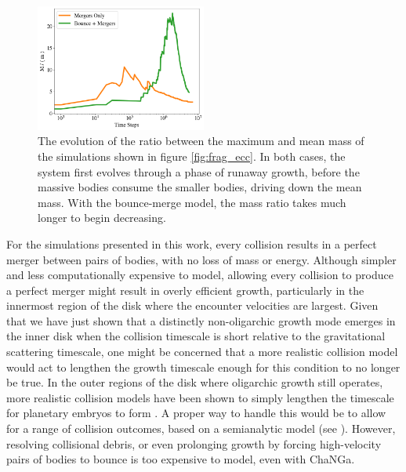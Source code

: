 \documentclass[twocolumn,linenumbers]{aastex63}
\begin{document}
\begin{figure}
\begin{center}
    \includegraphics[width=0.5\textwidth]{figures/frag_evo.png}
    \caption{The evolution of the ratio between the maximum and mean mass of the simulations shown in figure \ref{fig:frag_ecc}. 
    In both cases, the system first evolves through a phase of runaway growth, before the massive bodies consume the smaller 
    bodies, driving down the mean mass. With the bounce-merge model, the mass ratio takes much longer to begin decreasing.\label{fig:frag_evo}}
\end{center}
\end{figure}

For the simulations presented in this work, every collision results in a perfect merger between pairs of bodies, with no loss
of mass or energy. Although simpler and less computationally expensive to model, allowing every collision to produce a
perfect merger might result in overly efficient growth, particularly in the innermost region of the disk where the encounter 
velocities are largest. Given that we have just shown that a distinctly non-oligarchic growth mode emerges in the inner disk when the 
collision timescale is short relative to the gravitational scattering timescale, one might be concerned that a more realistic collision model would act 
to lengthen the growth timescale enough for this condition to no longer be true. In the outer regions of the disk where oligarchic growth still 
operates, more realistic collision models have been shown to simply lengthen the timescale for planetary embryos to form 
\citep{wetherill93, leinhardt05}. A proper way to handle this would be to allow for a range of collision outcomes, based on a semianalytic 
model (see \citet{leinhardt12}). However, resolving collisional debris, or even prolonging growth by forcing high-velocity pairs of 
bodies to bounce is too expensive to model, even with {\sc ChaNGa}.
\end{document}
